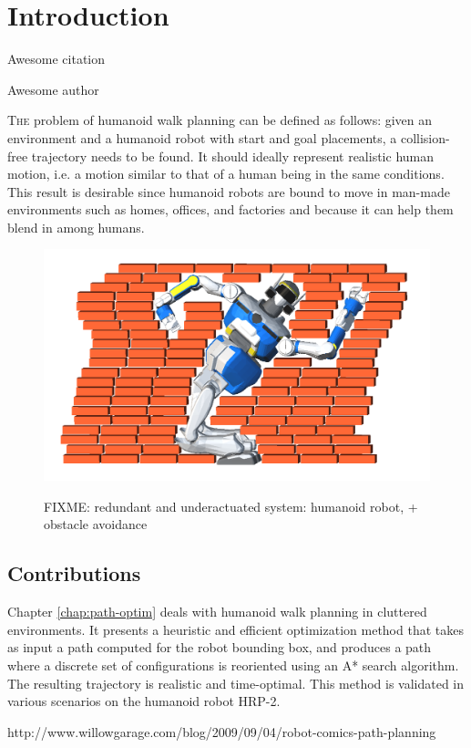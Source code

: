 \chapter{Introduction}\label{chap:chap0}

\epigraph{Awesome citation}{Awesome author}
\clearpage

\lettrine[lines=2, lraise=0., nindent=0em, slope=-.5em]%
{T}{he} problem of humanoid walk planning can be defined as follows:
given an environment and a humanoid robot with start and goal
placements, a collision-free trajectory needs to be found. It should
ideally represent realistic human motion, i.e. a motion similar to
that of a human being in the same conditions. This result is desirable
since humanoid robots are bound to move in man-made environments such
as homes, offices, and factories and because it can help them blend in
among humans.

\begin{figure}
  \centering
      {\includegraphics[width = 0.9\linewidth]
        {src/chap1-path-optimization/hrp2-brick-wall.png}}
      \caption{FIXME: redundant and underactuated system: humanoid
        robot, + obstacle avoidance}
      \label{fig:chap0-hrp2-brick-wall}
\end{figure}

\section[Contributions]{Contributions}

Chapter \autoref{chap:path-optim} deals with humanoid walk planning in
cluttered environments. It presents a heuristic and efficient
optimization method that takes as input a path computed for the robot
bounding box, and produces a path where a discrete set of
configurations is reoriented using an A* search algorithm. The
resulting trajectory is realistic and time-optimal. This method is
validated in various scenarios on the humanoid robot HRP-2.

http://www.willowgarage.com/blog/2009/09/04/robot-comics-path-planning


